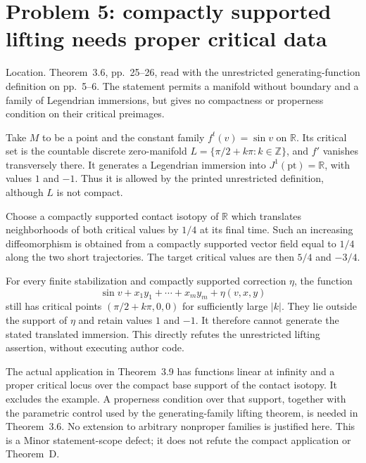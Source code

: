 \documentclass[10pt]{article}
\begin{document}
\section*{Problem 5: compactly supported lifting needs proper critical data}
Location. Theorem 3.6, pp. 25–26, read with the unrestricted generating-function definition on pp. 5–6. The statement permits a manifold without boundary and a family of Legendrian immersions, but gives no compactness or properness condition on their critical preimages.\par
Take \(M\) to be a point and the constant family \(f^t(v)=\sin v\) on \(\mathbb R\). Its critical set is the countable discrete zero-manifold \(L=\{\pi/2+k\pi:k\in\mathbb Z\}\), and \(f'\) vanishes transversely there. It generates a Legendrian immersion into \(J^1(\mathrm{pt})=\mathbb R\), with values \(1\) and \(-1\). Thus it is allowed by the printed unrestricted definition, although \(L\) is not compact.\par
Choose a compactly supported contact isotopy of \(\mathbb R\) which translates neighborhoods of both critical values by \(1/4\) at its final time. Such an increasing diffeomorphism is obtained from a compactly supported vector field equal to \(1/4\) along the two short trajectories. The target critical values are then \(5/4\) and \(-3/4\).\par
For every finite stabilization and compactly supported correction \(\eta\), the function \[\sin v+x_1y_1+\cdots+x_my_m+\eta(v,x,y)\] still has critical points \((\pi/2+k\pi,0,0)\) for sufficiently large \(|k|\). They lie outside the support of \(\eta\) and retain values \(1\) and \(-1\). It therefore cannot generate the stated translated immersion. This directly refutes the unrestricted lifting assertion, without executing author code.\par
The actual application in Theorem 3.9 has functions linear at infinity and a proper critical locus over the compact base support of the contact isotopy. It excludes the example. A properness condition over that support, together with the parametric control used by the generating-family lifting theorem, is needed in Theorem 3.6. No extension to arbitrary nonproper families is justified here. This is a Minor statement-scope defect; it does not refute the compact application or Theorem D.\par
\end{document}
